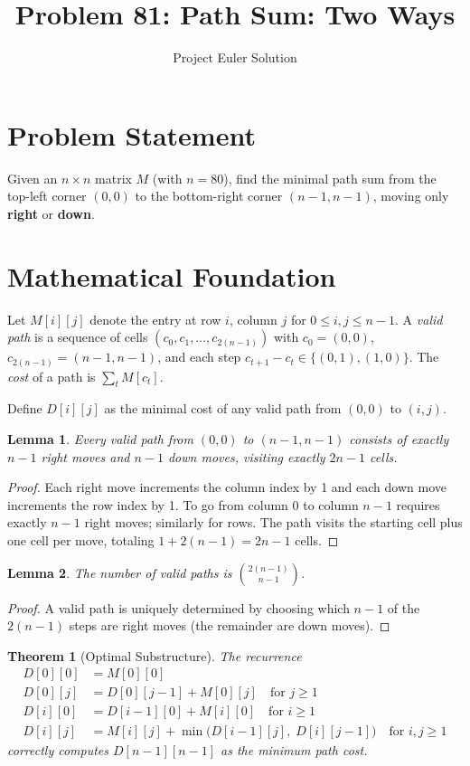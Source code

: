 \documentclass[12pt]{article}
\title{Problem 81: Path Sum: Two Ways}
\author{Project Euler Solution}
\date{}
\newtheorem{theorem}{Theorem}
\newtheorem{lemma}{Lemma}
\begin{document}
\maketitle

\section{Problem Statement}

Given an $n \times n$ matrix $M$ (with $n = 80$), find the minimal path sum from the top-left corner $(0,0)$ to the bottom-right corner $(n-1,n-1)$, moving only \textbf{right} or \textbf{down}.

\section{Mathematical Foundation}

Let $M[i][j]$ denote the entry at row $i$, column $j$ for $0 \leq i,j \leq n-1$. A \emph{valid path} is a sequence of cells $(c_0, c_1, \ldots, c_{2(n-1)})$ with $c_0 = (0,0)$, $c_{2(n-1)} = (n-1,n-1)$, and each step $c_{t+1} - c_t \in \{(0,1),(1,0)\}$. The \emph{cost} of a path is $\sum_t M[c_t]$.

Define $D[i][j]$ as the minimal cost of any valid path from $(0,0)$ to $(i,j)$.

\begin{lemma}
Every valid path from $(0,0)$ to $(n-1,n-1)$ consists of exactly $n-1$ right moves and $n-1$ down moves, visiting exactly $2n-1$ cells.
\end{lemma}

\begin{proof}
Each right move increments the column index by 1 and each down move increments the row index by 1. To go from column 0 to column $n-1$ requires exactly $n-1$ right moves; similarly for rows. The path visits the starting cell plus one cell per move, totaling $1 + 2(n-1) = 2n-1$ cells.
\end{proof}

\begin{lemma}
The number of valid paths is $\binom{2(n-1)}{n-1}$.
\end{lemma}

\begin{proof}
A valid path is uniquely determined by choosing which $n-1$ of the $2(n-1)$ steps are right moves (the remainder are down moves).
\end{proof}

\begin{theorem}[Optimal Substructure]
The recurrence
\begin{align}
D[0][0] &= M[0][0] \\
D[0][j] &= D[0][j-1] + M[0][j] \quad \text{for } j \geq 1 \\
D[i][0] &= D[i-1][0] + M[i][0] \quad \text{for } i \geq 1 \\
D[i][j] &= M[i][j] + \min\bigl(D[i-1][j],\; D[i][j-1]\bigr) \quad \text{for } i,j \geq 1
\end{align}
correctly computes $D[n-1][n-1]$ as the minimum path cost.
\end{theorem}
\end{document}
